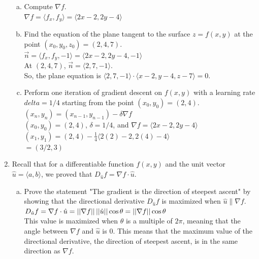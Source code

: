\begin{enumerate}
\begin{enumerate}[a.]
		\item Compute $\nabla f$.\\
		\indent
		$\nabla f = \langle f_x, f_y\rangle = \langle 2x-2, 2y-4 \rangle$\\
		
		\item Find the equation of the plane tangent to the surface $z = f(x,y)$ at the point $(x_0, y_0, z_0) = (2,4,7)$.\\
		\indent
		$\vec{n} = \langle f_x, f_y, -1\rangle = \langle 2x-2, 2y-4, -1 \rangle$\\
		At $(2,4,7)$, $\vec{n} = \langle 2, 7, -1 \rangle$.\\
		So, the plane equation is $\langle 2, 7, -1 \rangle \cdot \langle x-2, y-4, z-7 \rangle = 0$.\\
		
		\item Perform one iteration of gradient descent on $f(x,y)$ with a learning rate $delta = 1/4$ starting from the point $(x_0,y_0) = (2,4)$.\\
		\indent
		$(x_n, y_n) = (x_{n-1},y_{n-1}) - \delta\nabla f$\\
		$(x_0, y_0) = (2,4)$, $\delta = 1/4$, and $\nabla f = \langle 2x-2, 2y-4 \rangle$\\
		$(x_1, y_1) = (2,4) - \frac{1}{4} \langle 2(2)-2, 2(4)-4 \rangle$\\
		$= (3/2, 3)$\\
	\end{enumerate}

	\item Recall that for a differentiable function $f(x,y)$ and the unit vector $\hat{u} = \langle a, b \rangle$, we proved that $D_{\hat{u}}f = \nabla f \cdot \hat{u}$.
	\begin{enumerate}[a.]
		\item Prove the statement "The gradient is the direction of steepest ascent" by showing that the directional derivative $D_{\hat{u}}f$ is maximized when $\hat{u}\parallel\nabla f$.\\
		\indent
		$D_{\hat{u}}f = \nabla f \cdot \hat{u}=\left|\left|\nabla f\right|\right|\left|\left|\hat{u}\right|\right|\cos{\theta} = \left|\left|\nabla f\right|\right|\cos{\theta}$\\
		This value is maximized when $\theta$ is a multiple of $2\pi$, meaning that the angle between $\nabla f$ and $\hat{u}$ is 0. This means that the maximum value of the directional derivative, the direction of steepest ascent, is in the same direction as $\nabla f$.\\
			

\end{enumerate}
\end{enumerate}
